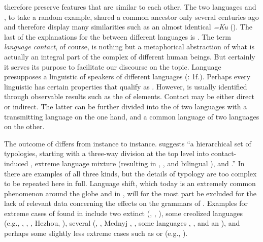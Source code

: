 therefore preserve features that are similar to each other. The two  languages  and , to take a random example, shared a common ancestor only several centuries ago and therefore display many similarities such as an almost identical  \textit{=Ku} (). The last of the explanations for the  between different languages is . The term \textit{language contact}, of course, is nothing but a metaphorical abstraction of what is actually an integral part of the complex  of different human beings. But certainly it serves its purpose to facilitate our discourse on the topic. Language  presupposes a linguistic  of speakers of different languages (\citealt{Thomason2001}: 1f.). Perhaps every linguistic  has certain properties that qualify as . However,  is usually identified through observable results such as the  of elements. Contact may be either direct or indirect. The latter can be further divided into the  of two languages with a transmitting language on the one hand, and a common  language of two languages on the other.

The outcome of  differs from instance to instance. \citet[10]{Thomason2001} suggests “a hierarchical set of typologies, starting with a three-way division at the top level into contact-induced , extreme language mixture (resulting in , , and bilingual ), and .” In  there are examples of all three kinds, but the details of  typology are too complex to be repeated here in full. Language shift, which today is an extremely common phenomenon around the globe and in , will for the most part be excluded for the lack of relevant data concerning the effects on the grammars of . Examples for extreme cases of  found in  include two extinct  (, , ), some creolized languages (e.g., , , , Hezhou, ), several  (, , Mednyj , , some  languages , , and an ), and perhaps some slightly less extreme cases such as  or  (e.g., \citealt{McWhorter2007}).

